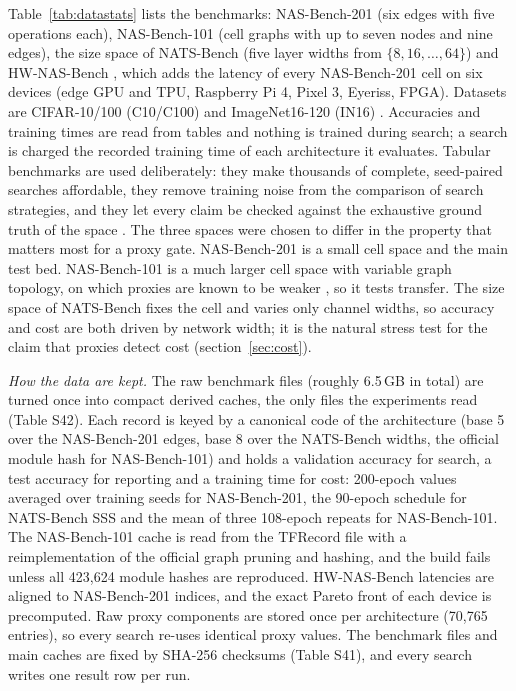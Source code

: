 \documentclass{sadhana}
\begin{document}
Table~\ref{tab:datastats} lists the benchmarks: NAS-Bench-201 \cite{dong2020} (six edges with five operations each), NAS-Bench-101 \cite{ying2019} (cell graphs with up to seven nodes and nine edges), the size space of NATS-Bench \cite{dong2022} (five layer widths from $\{8,16,\dots,64\}$) and HW-NAS-Bench \cite{li2021hw}, which adds the latency of every NAS-Bench-201 cell on six devices (edge GPU and TPU, Raspberry Pi 4, Pixel 3, Eyeriss, FPGA). Datasets are CIFAR-10/100 (C10/C100) \cite{krizhevsky2009} and ImageNet16-120 (IN16) \cite{chrabaszcz2017}. Accuracies and training times are read from tables and nothing is trained during search; a search is charged the recorded training time of each architecture it evaluates. Tabular benchmarks are used deliberately: they make thousands of complete, seed-paired searches affordable, they remove training noise from the comparison of search strategies, and they let every claim be checked against the exhaustive ground truth of the space \cite{ying2019,dong2020,yang2020}. The three spaces were chosen to differ in the property that matters most for a proxy gate. NAS-Bench-201 is a small cell space and the main test bed. NAS-Bench-101 is a much larger cell space with variable graph topology, on which proxies are known to be weaker \cite{krishnakumar2022}, so it tests transfer. The size space of NATS-Bench fixes the cell and varies only channel widths, so accuracy and cost are both driven by network width; it is the natural stress test for the claim that proxies detect cost (section~\ref{sec:cost}).


\textit{How the data are kept.} The raw benchmark files (roughly 6.5\,GB in total) are turned once into compact derived caches, the only files the experiments read (Table S42). Each record is keyed by a canonical code of the architecture (base 5 over the NAS-Bench-201 edges, base 8 over the NATS-Bench widths, the official module hash for NAS-Bench-101) and holds a validation accuracy for search, a test accuracy for reporting and a training time for cost: 200-epoch values averaged over training seeds for NAS-Bench-201, the 90-epoch schedule for NATS-Bench SSS and the mean of three 108-epoch repeats for NAS-Bench-101. The NAS-Bench-101 cache is read from the TFRecord file with a reimplementation of the official graph pruning and hashing, and the build fails unless all 423,624 module hashes are reproduced. HW-NAS-Bench latencies are aligned to NAS-Bench-201 indices, and the exact Pareto front of each device is precomputed. Raw proxy components are stored once per architecture (70,765 entries), so every search re-uses identical proxy values. The benchmark files and main caches are fixed by SHA-256 checksums (Table S41), and every search writes one result row per run.
\end{document}
